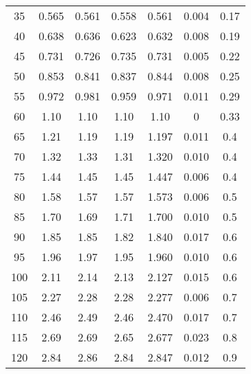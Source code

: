 \begin{table}[H]
\begin{tabular}{
      S[table-format=3.0] 
      S[table-format=1.4] S[table-format=1.4] S[table-format=1.4]
      S[table-format=1.4] S[table-format=1.4] S[table-format=1.3]
      }
      35  & 0.565  &  0.561  &  0.558  &  0.561  & 0.004  & 0.17   \\
      40  & 0.638  &  0.636  &  0.623  &  0.632  & 0.008  & 0.19   \\
      45  & 0.731  &  0.726  &  0.735  &  0.731  & 0.005  & 0.22   \\
      50  & 0.853  &  0.841  &  0.837  &  0.844  & 0.008  & 0.25   \\
      55  & 0.972  &  0.981  &  0.959  &  0.971  & 0.011  & 0.29   \\
      60  & 1.10   &  1.10   &  1.10   &  1.10   & 0      & 0.33   \\
      65  & 1.21   &  1.19   &  1.19   &  1.197  & 0.011  & 0.4    \\
      70  & 1.32   &  1.33   &  1.31   &  1.320  & 0.010  & 0.4    \\
      75  & 1.44   &  1.45   &  1.45   &  1.447  & 0.006  & 0.4    \\
      80  & 1.58   &  1.57   &  1.57   &  1.573  & 0.006  & 0.5    \\
      85  & 1.70   &  1.69   &  1.71   &  1.700  & 0.010  & 0.5    \\
      90  & 1.85   &  1.85   &  1.82   &  1.840  & 0.017  & 0.6    \\
      95  & 1.96   &  1.97   &  1.95   &  1.960  & 0.010  & 0.6    \\
      100 & 2.11   &  2.14   &  2.13   &  2.127  & 0.015  & 0.6    \\
      105 & 2.27   &  2.28   &  2.28   &  2.277  & 0.006  & 0.7    \\
      110 & 2.46   &  2.49   &  2.46   &  2.470  & 0.017  & 0.7    \\
      115 & 2.69   &  2.69   &  2.65   &  2.677  & 0.023  & 0.8    \\
      120 & 2.84   &  2.86   &  2.84   &  2.847  & 0.012  & 0.9    \\
      \bottomrule 
    \end{tabular}
\end{table}
%

